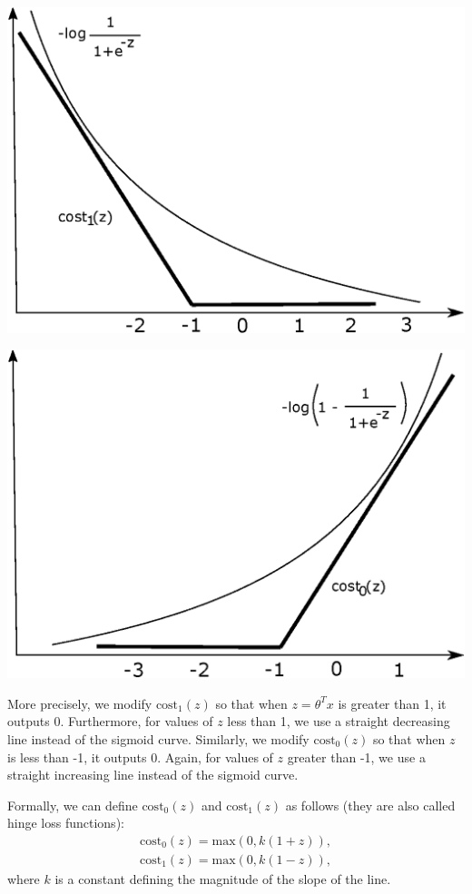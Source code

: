 \documentclass[a4paper,11pt]{report}
\begin{document}
\begin{center}
\begin{minipage}{0.48\textwidth}
 \centering
 \includegraphics[width=.8\linewidth]{ml_images/cost_1_approx}
\end{minipage}\hfill
\begin{minipage}{0.48\textwidth}
 \centering
 \includegraphics[width=.8\linewidth]{ml_images/cost_0_approx}
\end{minipage}
\end{center}

More precisely, we modify $\text{cost}_1(z)$ so that when $z = \theta^Tx$ is greater than 1, it outputs 0. Furthermore, for values of $z$ less than 1, we use a straight decreasing line instead of the sigmoid curve.
Similarly, we modify $\text{cost}_0(z)$ so that when $z$ is less than -1, it outputs 0. Again, for values of $z$ greater than -1, we use a straight increasing line instead of the sigmoid curve.

Formally, we can define $\text{cost}_0(z)$ and $\text{cost}_1(z)$ as follows (they are also called hinge loss functions):
\begin{equation}\label{eq:hinge-loss}
\begin{split}
\text{cost}_0(z) = \text{max}(0,k(1+z)),\\
\text{cost}_1(z) = \text{max}(0,k(1−z)),
\end{split}
\end{equation}
where $k$ is a constant defining the magnitude of the slope of the line.
\end{document}
